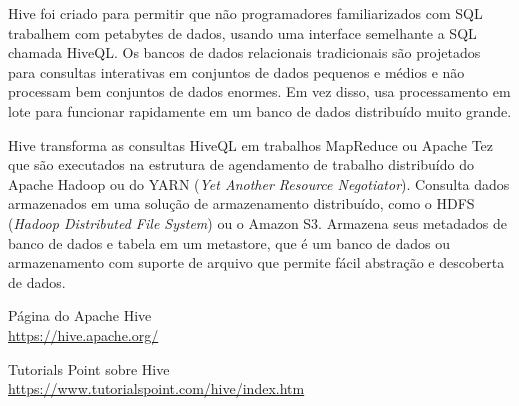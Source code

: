 \documentclass[a4paper,11pt]{article}
\begin{document}
Hive foi criado para permitir que não programadores familiarizados com SQL trabalhem com petabytes de dados, usando uma interface semelhante a SQL chamada HiveQL. Os bancos de dados relacionais tradicionais são projetados para consultas interativas em conjuntos de dados pequenos e médios e não processam bem conjuntos de dados enormes. Em vez disso, usa processamento em lote para funcionar rapidamente em um banco de dados distribuído muito grande. 

Hive transforma as consultas HiveQL em trabalhos MapReduce ou Apache Tez que são executados na estrutura de agendamento de trabalho distribuído do Apache Hadoop ou do YARN (\textit{Yet Another Resource Negotiator}). Consulta dados armazenados em uma solução de armazenamento distribuído, como o HDFS (\textit{Hadoop Distributed File System}) ou o Amazon S3. Armazena seus metadados de banco de dados e tabela em um metastore, que é um banco de dados ou armazenamento com suporte de arquivo que permite fácil abstração e descoberta de dados. 



\begin{thebibliography}{4}
	Página do Apache Hive \\
	\url{https://hive.apache.org/}

	Tutorials Point sobre Hive \\
	\url{https://www.tutorialspoint.com/hive/index.htm}
	
	
\end{thebibliography}
\end{document}
